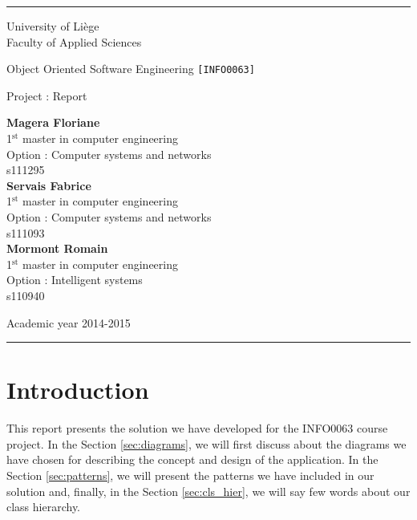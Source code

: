 \documentclass[a4paper,11pt]{article}
\begin{document}
\rule{1\linewidth}{1px}
{ \sc
\begin{center}
{\small University of Liège}\\
{\small Faculty of Applied Sciences}

\end{center}

\vfill
\begin{center}

{\Huge Object Oriented Software Engineering {\LARGE \tt [INFO0063]}\\}
\end{center}
\begin{center}
{\Huge Project : Report}
\end{center}
\begin{center}
\textbf{Magera Floriane}\\
{\small 1$^{\text{st}}$ master in computer engineering}\\
{\small Option : Computer systems and networks}\\
{\small s111295}\\
\vspace{0.5cm}
\textbf{Servais Fabrice}\\
{\small 1$^{\text{st}}$ master in computer engineering}\\
{\small Option : Computer systems and networks}\\
{\small s111093}\\
\vspace{0.5cm}
\textbf{Mormont Romain}\\
{\small 1$^{\text{st}}$ master in computer engineering}\\
{\small Option : Intelligent systems}\\
{\small s110940}
\end{center}

\vfill
\begin{center}
Academic year 2014-2015\\
\end{center}
}
\rule{1\linewidth}{1px}
\newpage

\section{Introduction}

This report presents the solution we have developed for the INFO0063 course project. In the Section \ref{sec:diagrams}, we will first discuss about the diagrams we have chosen for describing the concept and design of the application. In the Section \ref{sec:patterns}, we will present the patterns we have included in our solution and, finally, in the Section \ref{sec:cls_hier}, we will say few words about our class hierarchy.
\end{document}
